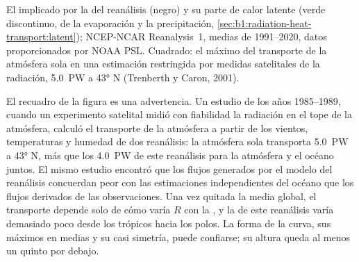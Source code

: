 \begin{omfigure}

{\small El  implicado por la  del reanálisis (negro) y su parte de calor latente (verde discontinuo, de la evaporación y la precipitación, \cref{sec:b1:radiation-heat-transport:latent}); NCEP-NCAR Reanalysis~1, medias de 1991--2020, datos proporcionados por NOAA PSL. Cuadrado: el máximo del transporte de la atmósfera sola en una estimación restringida por medidas satelitales de la radiación, \qty{5.0}{PW} a \ang{43} N (Trenberth y Caron, 2001).}
\label{fig:b1:radiation-heat-transport:transport}
\end{omfigure}

El recuadro de la figura es una advertencia. Un estudio de los años 1985--1989, cuando un experimento satelital midió con fiabilidad la radiación en el tope de la atmósfera, calculó el transporte de la atmósfera a partir de los vientos, temperaturas y humedad de dos reanálisis: la atmósfera sola transporta \qty{5.0}{PW} a \ang{43} N, más que los \qty{4.0}{PW} de este reanálisis para la atmósfera y el océano juntos. El mismo estudio encontró que los flujos generados por el modelo del reanálisis concuerdan peor con las estimaciones independientes del océano que los flujos derivados de las observaciones. Una vez quitada la media global, el transporte depende solo de cómo varía $R$ con la , y la  de este reanálisis varía demasiado poco desde los trópicos hacia los polos. La forma de la curva, sus máximos en  medias y su casi simetría, puede confiarse; su altura queda al menos un quinto por debajo.

